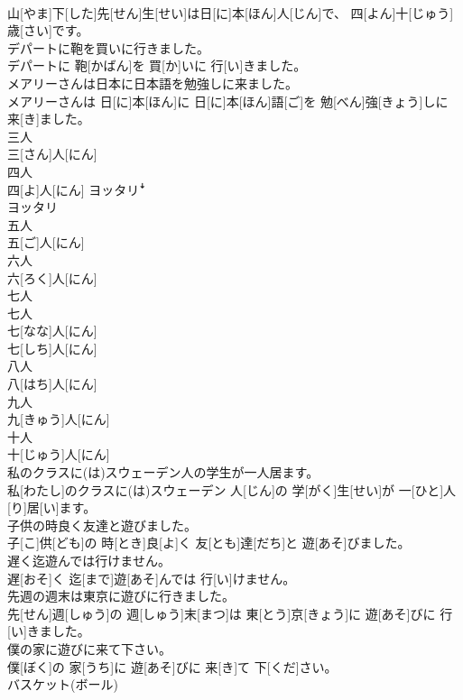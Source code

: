 \documentclass[8pt]{extreport}
\begin{document}
\begin{CJK}{UTF8}{min}
\\	山[やま]下[した]先[せん]生[せい]は日[に]本[ほん]人[じん]で、 四[よん]十[じゅう]歳[さい]です。
\\	デパートに鞄を買いに行きました。	
\\	デパートに 鞄[かばん]を 買[か]いに 行[い]きました。
\\	メアリーさんは日本に日本語を勉強しに来ました。	
\\	メアリーさんは 日[に]本[ほん]に 日[に]本[ほん]語[ご]を 勉[べん]強[きょう]しに 来[き]ました。
\\	三人	
\\	三[さん]人[にん]
\\	四人	
\\	四[よ]人[にん]	ヨッタリꜜ 
\\	ヨッタリ
\\	五人	
\\	五[ご]人[にん]
\\	六人	
\\	六[ろく]人[にん]	
\\	七人 
\\	七人	
\\	七[なな]人[にん] 
\\	七[しち]人[にん]
\\	八人	
\\	八[はち]人[にん]	
\\	九人	
\\	九[きゅう]人[にん]
\\	十人	
\\	十[じゅう]人[にん]	
\\	私のクラスに(は)スウェーデン人の学生が一人居ます。	
\\	私[わたし]のクラスに(は)スウェーデン 人[じん]の 学[がく]生[せい]が 一[ひと]人[り]居[い]ます。
\\	子供の時良く友達と遊びました。	
\\	子[こ]供[ども]の 時[とき]良[よ]く 友[とも]達[だち]と 遊[あそ]びました。
\\	遅く迄遊んでは行けません。	
\\	遅[おそ]く 迄[まで]遊[あそ]んでは 行[い]けません。
\\	先週の週末は東京に遊びに行きました。	
\\	先[せん]週[しゅう]の 週[しゅう]末[まつ]は 東[とう]京[きょう]に 遊[あそ]びに 行[い]きました。
\\	僕の家に遊びに来て下さい。	
\\	僕[ぼく]の 家[うち]に 遊[あそ]びに 来[き]て 下[くだ]さい。
\\	バスケット(ボール)	

\end{CJK}
\end{document}
